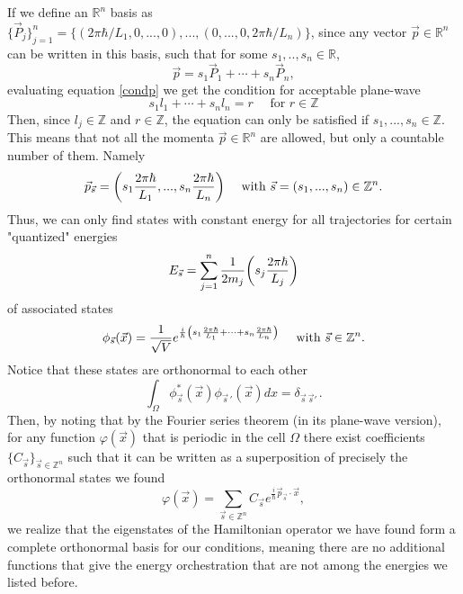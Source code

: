 \documentclass[11pt, a4paper]{article} %
\newcommand{\R}{\mathbb{R}} %
\newcommand{\Z}{\mathbb{Z}} %
\begin{document}
If we define an $\R^n$ basis as $\{\vec{P}_j\}_{j=1}^n=\{(2\pi\hbar/L_1,0,...,0), ..., (0,...,0,2\pi\hbar/L_n)\}$, since any vector $\vec{p}\in\R^n$ can be written in this basis, such that for some $s_1,..,s_n\in\R$,
\begin{equation}
\vec{p}=s_1\vec{P}_1+\cdots+s_n\vec{P}_n,
\end{equation}
evaluating equation \eqref{condp} we get the condition for acceptable plane-wave
\begin{equation}
s_1l_1+\cdots+s_nl_n= r \quad \text{ for }r\in\Z
\end{equation}
Then, since $l_j\in\Z$ and $r\in\Z$, the equation can only be satisfied if $s_1,...,s_n\in\Z$. This means that not all the momenta $\vec{p}\in\R^n$ are allowed, but only a countable number of them. Namely
\begin{equation}
\vec{p}_{\vec{s}}=\qty(s_1\frac{2\pi\hbar}{L_1},...,s_n\frac{2\pi\hbar}{L_n})\quad \text{ with } \vec{s}=(s_1,...,s_n)\in\Z^n.
\end{equation}
Thus, we can only find states with constant energy for all trajectories for certain "quantized" energies
\begin{equation}
E_{\vec{s}}=\sum_{j=1}^n\frac{1}{2m_j}\qty(s_j\frac{2\pi\hbar}{L_j})
\end{equation}
of associated states 
\begin{equation}
\phi_{\vec{s}}(\vec{x})=\frac{1}{\sqrt{V}} e^{\frac{i}{\hbar}\qty(s_1\frac{2\pi\hbar}{L_1}+\cdots+s_n\frac{2\pi\hbar}{L_n})} \quad \text{ with }\vec{s}\in\Z^n.
\end{equation}
Notice that these states are orthonormal to each other
\begin{equation}
\int_{\Omega} \phi^*_{\vec{s}}(\vec{x})\phi_{\vec{s}\,'}(\vec{x}) dx = \delta_{\vec{s}\,\vec{s}'\,}.
\end{equation}
Then, by noting that by the Fourier series theorem (in its plane-wave version), for any function $\varphi(\vec{x})$ that is periodic in the cell $\Omega$ there exist coefficients $\{C_{\vec{s}}\}_{\vec{s}\in\Z^n}$ such that it can be written as a superposition of precisely the orthonormal states we found
\begin{equation}
\varphi(\vec{x})=\sum_{\vec{s}\in\Z^n}C_{\vec{s}}e^{\frac{i}{\hbar}\vec{p}_{\vec{s}}\cdot \vec{x}},
\end{equation}
we realize that the eigenstates of the Hamiltonian operator we have found form a complete orthonormal basis for our conditions, meaning there are no additional functions that give the energy orchestration that are not among the energies we listed before.
\end{document}
